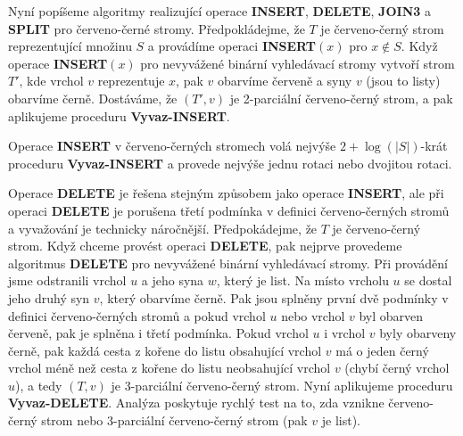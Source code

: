 \documentclass[a4paper,12pt]{article}
\begin{document}
\midinsert
\centerline{}
\endcaption
\endinsert



\midinsert
\centerline{}
\endcaption
\endinsert

\midinsert
\centerline{}
\endcaption
\endinsert

Nyní popíšeme algoritmy realizující operace {\bf INSERT}, 
{\bf DE\-LE\-TE}, {\bf JOIN3} a {\bf SPLIT} pro červeno-černé stromy.  
Před\-po\-klá\-dejme, že $T$ je červeno-černý strom reprezentující 
množinu $S$ a pro\-vá\-dí\-me operaci {\bf INSERT$(x)$} pro $
x\notin S$.  Když 
ope\-race {\bf IN\-SERT$(x)$} pro nevyvážené binární vyhledávací stro\-my 
vytvoří strom $T'$, kde vrchol $v$ reprezentuje $x$, pak $
v$ 
obar\-ví\-me červeně a syny $v$ (jsou to listy) obarvíme černě.  
Dostáváme, že $(T',v)$ je 2-parciální červeno-černý strom, a pak 
aplikujeme proceduru {\bf Vyvaz-INSERT}.  

Operace {\bf INSERT} v červeno-černých stromech 
volá nejvýše $2+\log(|S|)$-krát proceduru {\bf Vyvaz-INSERT} a 
provede nejvýše jednu rotaci nebo dvojitou rotaci.

Operace {\bf DELETE} je řešena stejným způsobem 
jako ope\-race {\bf INSERT}, ale při operaci {\bf DELETE} je porušena třetí 
pod\-mín\-ka v definici červeno-černých stro\-mů a 
vyvažování je technicky náročnější.  
Předpokádejme, že $T$ je červeno-černý strom. Když chceme 
provést operaci {\bf DELETE}, pak nejprve provedeme algoritmus {\bf DELETE} 
pro nevyvážené 
binární vyhledávací stro\-my. Při provádění jsme 
odstranili vrchol $u$ a jeho syna $w$, který je list. Na 
místo vrcholu $u$ se dostal jeho druhý syn $v$, který 
obarvíme černě. Pak jsou splněny první 
dvě podmínky v definici červeno-černých 
stromů a pokud vrchol $u$ nebo vrchol $v$ byl
obarven červeně, pak je splněna i 
třetí podmínka. Pokud vrchol $u$ i vrchol $v$ byly obarveny 
černě, pak každá cesta z kořene do listu obsahující 
vrchol $v$ má o jeden černý  vrchol méně  než cesta z 
kořene do listu neobsahující vrchol $v$ (chybí černý  
vrchol $u$), a tedy $(T,v)$ je 3-parciální červeno-černý strom. 
Nyní aplikujeme proceduru {\bf Vyvaz-DELETE}.
Analýza poskytuje rychlý test na to, zda 
vznikne červeno-černý strom nebo 3-parciální 
červeno-černý strom (pak $v$ je list). 
\end{document}
